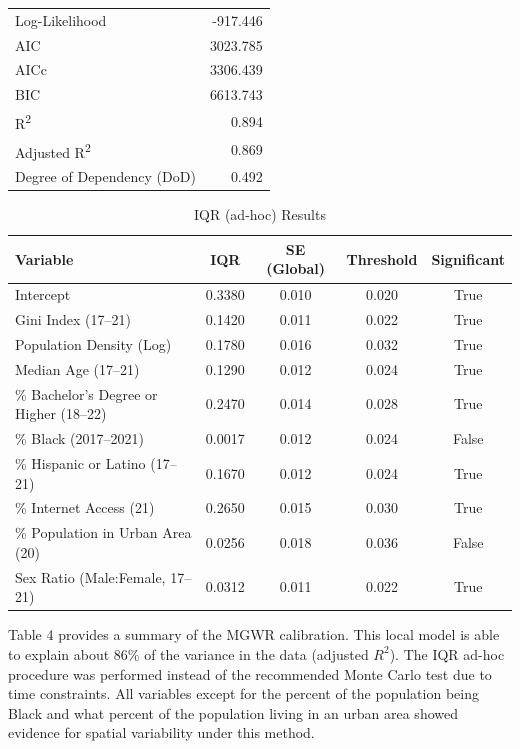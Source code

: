 \documentclass[
]{article}
\begin{document}
\begin{table}[H]
\begin{tabular}{lccccc}
Log-Likelihood           & \multicolumn{5}{r}{-917.446} \\
AIC                      & \multicolumn{5}{r}{3023.785} \\
AICc                     & \multicolumn{5}{r}{3306.439} \\
BIC                      & \multicolumn{5}{r}{6613.743} \\
R\textsuperscript{2}     & \multicolumn{5}{r}{0.894} \\
Adjusted R\textsuperscript{2} & \multicolumn{5}{r}{0.869} \\
Degree of Dependency (DoD) & \multicolumn{5}{r}{0.492} \\ \hline
\end{tabular}
\end{table}
\begin{table}[H]
\renewcommand{\arraystretch}{1.3} %
\setlength{\tabcolsep}{12pt} %
\centering
\caption{IQR (ad-hoc) Results}
\label{tab:iqr_results}
\begin{tabular}{lcccc}
\hline
\textbf{Variable} & \textbf{IQR} & \textbf{SE (Global)} & \textbf{Threshold} & \textbf{Significant} \\ \hline
Intercept                & 0.3380 & 0.010 & 0.020 & True \\ 
Gini Index (17–21)       & 0.1420 & 0.011 & 0.022 & True \\ 
Population Density (Log) & 0.1780 & 0.016 & 0.032 & True \\ 
Median Age (17–21)       & 0.1290 & 0.012 & 0.024 & True \\ 
\% Bachelor's Degree or Higher (18–22) & 0.2470 & 0.014 & 0.028 & True \\ 
\% Black (2017–2021)     & 0.0017 & 0.012 & 0.024 & False \\ 
\% Hispanic or Latino (17–21) & 0.1670 & 0.012 & 0.024 & True \\ 
\% Internet Access (21)  & 0.2650 & 0.015 & 0.030 & True \\ 
\% Population in Urban Area (20) & 0.0256 & 0.018 & 0.036 & False \\ 
Sex Ratio (Male:Female, 17–21) & 0.0312 & 0.011 & 0.022 & True \\ 
\hline
\end{tabular}
\end{table}

\newpage

Table 4 provides a summary of the MGWR calibration. This local model is
able to explain about \(86\%\) of the variance in the data (adjusted
\(R^{2}\)). The IQR ad-hoc procedure was performed instead of the
recommended Monte Carlo test due to time constraints. All variables
except for the percent of the population being Black and what percent of
the population living in an urban area showed evidence for spatial
variability under this method.
\end{document}
